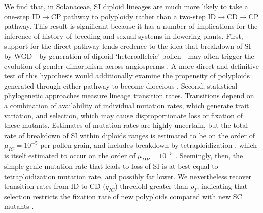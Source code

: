 We find that, in Solanaceae, SI diploid lineages are much more likely to take a
one-step  ID$\rightarrow$CP pathway to polyploidy rather than a two-step ID$\rightarrow$CD$\rightarrow$CP pathway.
This result is significant because it has a number of implications for the inference of history of breeding and sexual systems in flowering plants.
First, support for the direct pathway lends credence to the idea that breakdown of SI by WGD---by generation of diploid `heteroalleleic' pollen---may often trigger the evolution of gender dimorphism across angiosperms \citep{miller_2000}.
A more direct and definitive test of this hypothesis would additionally examine the propensity of polyploids generated through either pathway to become dioecious \citep{robertson_2011}.
Second, statistical phylogenetic approaches measure lineage transition rates.
Transitions depend on a combination of availability of individual mutation rates, which generate trait variation, and selection, which may cause disproportionate loss or fixation of these mutants.
Estimates of mutation rates are highly uncertain, but the total rate of breakdown of SI within diploids ranges is estimated to be on the order of  $\mu_{IC} = 10^{-5}$ per pollen grain, and includes breakdown by tetraploidization \citep{lewis1979}, which is itself estimated to occur on the order of $\mu_{DP} = 10^{-5}$ \citep{ramsey_1998}. 
Seemingly, then, the simple genic mutation rate that leads to loss of SI is at best equal to tetraploidization mutation rate, and possibly far lower.
We nevertheless recover transition rates from ID to CD ($q_{IC}$) threefold greater than $\rho_{I}$, indicating that selection restricts the fixation rate of new polyploids compared with new SC mutants \citep{robertson_2011}.

